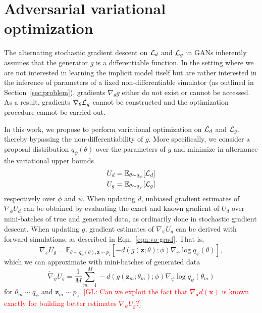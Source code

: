 \documentclass[twocolumn,superscriptaddress,aps]{revtex4-1}
\newcommand{\glnote}[1]{\textcolor{red}{[GL: #1]}}
\theoremstyle{plain}
\begin{document}

\section{Adversarial variational optimization}

The alternating stochastic gradient descent on ${\cal L}_d$ and ${\cal L}_g$ in
GANs inherently assumes that the generator $g$ is a differentiable function. In
the setting where we are not interested in learning the implicit model itself but are
rather interested in the inference of parameters of a fixed
non-differentiable simulator (as outlined in Section~\ref{sec:problem}),
gradients $\nabla_\theta g$ either do not exist or cannot be accessed. As a
result, gradients $\nabla_\theta {\cal L}_g$ cannot be constructed and the
optimization procedure cannot be carried out.

In this work, we propose to perform variational optimization
on ${\cal L}_d$ and ${\cal L}_g$, thereby bypassing the non-differentiability
of $g$. More specifically, we consider a proposal distribution $q_\psi(\theta)$
over the parameters of $g$ and minimize in alternance the variational upper bounds
\begin{align}
    U_d &= \mathbb{E}_{\theta \sim q_\psi} [ {\cal L}_d ] \label{eqn:vo-ud} \\
    U_g &= \mathbb{E}_{\theta \sim q_\psi} [ {\cal L}_g ] \label{eqn:vo-ug}
\end{align}
respectively over $\phi$ and $\psi$.
When updating $d$, unbiased gradient estimates of $\nabla_\phi U_d$ can be
obtained by evaluating the exact and known gradient of $U_d$ over
mini-batches of true and generated data, as ordinarily
done in stochastic gradient descent. When updating $g$, gradient estimates
of $\nabla_\psi U_g$ can be derived with forward simulations, as described in Eqn.~\ref{eqn:vo-grad}.
That is,
\begin{equation}
    \nabla_\psi U_g = \mathbb{E}_{\theta \sim q_\psi(\theta), \mathbf{z} \sim p_z}  [-d(g(\mathbf{z};\theta);\phi) \nabla_\psi \log q_\psi(\theta)],
\end{equation}
which we can approximate with mini-batches of generated data
\begin{equation}
    \tilde{\nabla}_\psi U_g = \frac{1}{M} \sum_{m=1}^M -d(g(\mathbf{z}_m; \theta_m); \phi) \nabla_\psi \log q_\psi(\theta_m)
\end{equation}
for $\theta_m \sim q_\psi$ and $\mathbf{z}_m \sim p_z$.
\glnote{Can we exploit the fact that $\nabla_\mathbf{x} d(\mathbf{x})$ is known exactly for building better estimates $\tilde{\nabla}_\psi U_g$?}
\end{document}
